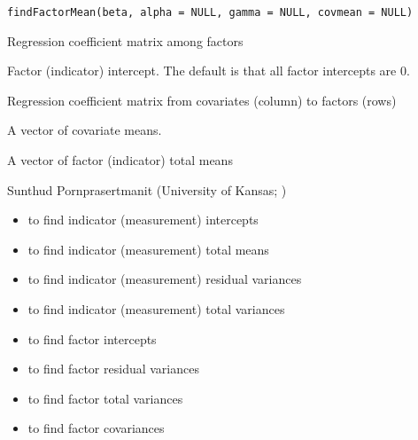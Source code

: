 \documentclass[a4paper]{book}
\begin{document}
%
\begin{Usage}
\begin{verbatim}
findFactorMean(beta, alpha = NULL, gamma = NULL, covmean = NULL)
\end{verbatim}
\end{Usage}
%
\begin{Arguments}
\begin{ldescription}
\item[\code{beta}] 
Regression coefficient matrix among factors

\item[\code{alpha}] 
Factor (indicator) intercept. The default is that all factor intercepts are 0.

\item[\code{gamma}] 
Regression coefficient matrix from covariates (column) to factors (rows)

\item[\code{covmean}] 
A vector of covariate means.

\end{ldescription}
\end{Arguments}
%
\begin{Value}
A vector of factor (indicator) total means
\end{Value}
%
\begin{Author}\relax
Sunthud Pornprasertmanit (University of Kansas; )
\end{Author}
%
\begin{SeeAlso}\relax
\begin{itemize}

\item {} to find indicator (measurement) intercepts
\item {} to find indicator (measurement) total means
\item {} to find indicator (measurement) residual variances
\item {} to find indicator (measurement) total variances
\item {} to find factor intercepts
\item {} to find factor residual variances
\item {} to find factor total variances
\item {} to find factor covariances

\end{itemize}

\end{SeeAlso}
\end{document}
